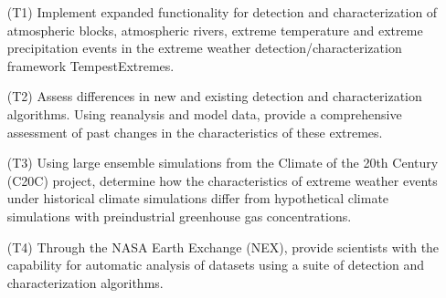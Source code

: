 \documentclass[11pt]{article}
\begin{document}
\begin{itemize}
\item[(T1)] Implement expanded functionality for detection and characterization of atmospheric blocks, atmospheric rivers, extreme temperature and extreme precipitation events in the extreme weather detection/characterization framework TempestExtremes.

\item[(T2)] Assess differences in new and existing detection and characterization algorithms.  Using reanalysis and model data, provide a comprehensive assessment of past changes in the characteristics of these extremes.

\item[(T3)] Using large ensemble simulations from the Climate of the 20th Century (C20C) project, determine how the characteristics of extreme weather events under historical climate simulations differ from hypothetical climate simulations with preindustrial greenhouse gas concentrations.

\item[(T4)] Through the NASA Earth Exchange (NEX), provide scientists with the capability for automatic analysis of datasets using a suite of detection and characterization algorithms. 
\end{itemize}
\end{document}
